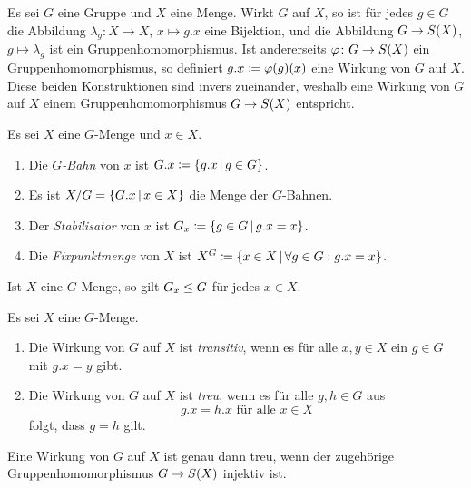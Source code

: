 Es sei $G$ eine Gruppe und $X$ eine Menge.
Wirkt $G$ auf $X$, so ist für jedes $g \in G$ die Abbildung $\lambda_g \colon X \to X$, $x \mapsto g.x$ eine Bijektion, und die Abbildung $G \to S(X)$, $g \mapsto \lambda_g$ ist ein Gruppenhomomorphismus.
Ist andererseits $\varphi \colon G \to S(X)$ ein Gruppenhomomorphismus, so definiert $g.x \coloneqq \varphi(g)(x)$ eine Wirkung von $G$ auf $X$.
Diese beiden Konstruktionen sind invers zueinander, weshalb eine Wirkung von $G$ auf $X$ einem Gruppenhomomorphismus $G \to S(X)$ entspricht.

\begin{definition}
  Es sei $X$ eine $G$-Menge und $x \in X$.
  \begin{enumerate}
    \item
      Die \emph{$G$-Bahn} von $x$ ist $G.x \defined \{g.x \suchthat g \in G\}$.
    \item
      Es ist $X/G = \{G.x \suchthat x \in X\}$ die Menge der $G$-Bahnen.
    \item
      Der \emph{Stabilisator} von $x$ ist $G_x \defined \{g \in G \suchthat g.x = x\}$.
    \item
      Die \emph{Fixpunktmenge} von $X$ ist $X^G \defined \{x \in X \suchthat \forall g \in G: g.x = x\}$.
  \end{enumerate}
\end{definition}

\begin{lemma}
  Ist $X$ eine $G$-Menge, so gilt $G_x \mathrel{\leq} G$ für jedes $x \in X$.
\end{lemma}

\begin{definition}
  Es sei $X$ eine $G$-Menge.
  \begin{enumerate}
    \item
      Die Wirkung von $G$ auf $X$ ist \emph{transitiv}, wenn es für alle $x, y \in X$ ein $g \in G$ mit $g.x = y$ gibt.
    \item
      Die Wirkung von $G$ auf $X$ ist \emph{treu}, wenn es für alle $g, h \in G$ aus
      \[
        \text{$g.x = h.x$ für alle $x \in X$}
      \]
      folgt, dass $g = h$ gilt.
  \end{enumerate}
\end{definition}

\begin{remark}
  Eine Wirkung von $G$ auf $X$ ist genau dann treu, wenn der zugehörige Gruppenhomomorphismus $G \to S(X)$ injektiv ist.
\end{remark}




